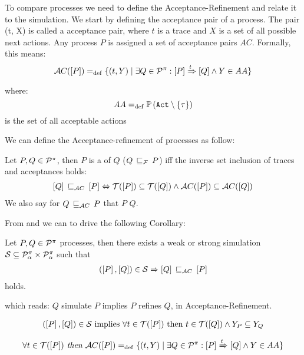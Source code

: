 To compare \picalc{} processes we need to define the Acceptance-Refinement and relate it to the simulation. We start by defining the acceptance pair of a process.
The pair (t, X) is called a acceptance pair, where $t$ is a trace and $X$ is a set of all possible next actions. Any process
$P$ is assigned a set of acceptance pairs $AC$. Formally, this means:
\begin{align}
    \accepatances[P] \define \{(t,Y) \mid \exists Q\in\procs: \ec{P} \bigstep{t} \ec{Q}\wedge Y\in AA\}
\label{failure}
\end{align}
where: \[AA \define \pom{\actions\setminus\set{\tau}}\] is the set of all acceptable actions

We can define the Acceptance-refinement of \picalc{} processes as follow:

\begin{definition}
\label{def_failure_ref}
	Let $P,Q\in\mathcal P^{\pi}$, then $P$ is a  of $Q$ ($Q\refiF P$) iff the inverse set inclusion of traces and acceptances holds:
\begin{align}
   \ec{Q} \refiAC \ec{P} \Leftrightarrow  \traces[P]\subseteq\traces[Q] \wedge \accepatances[P]\subseteq\accepatances[Q]
\end{align}
	We also say for $Q\refiAC{}P$ that $P$  $Q$.
\end{definition}

From  and  we can to drive the following Corollary: 

\begin{cor}
\label{cor_sim_acceptance_refinement}
Let $P,Q\in\mathcal P^{\pi}$ processes, then there exists a weak or strong simulation $\mathcal{S}\subseteq\mathcal P^{\pi}_\alpha\times\mathcal P^{\pi}_\alpha$ such that
\begin{align}
    (\ec{P},\ec{Q})\in{}\simu  \Rightarrow \ec{Q} \refiAC \ec{P}
   \label{acceptance_model}
\end{align}
holds.
\end{cor}%
which reads:  $Q$ simulate $P$ implies $P$ refines $Q$, in Acceptance-Refinement.

\begin{prf}
\item 
\begin{align*}
	(\ec{P},\ec{Q})\in\simu \text{ implies } \forall t \in\traces[P] \text{ then } t \in  \traces[Q] \wedge Y_P \subseteq Y_Q
\end{align*}

\begin{align}
    \forall t \in \traces[P] \textit{ then }\accepatances[P] \define \{(t,Y) \mid \exists Q\in\procs: \ec{P} \bigstep{t} \ec{Q}\wedge Y\in AA\}
\label{failure}
\end{align}

\end{prf}
